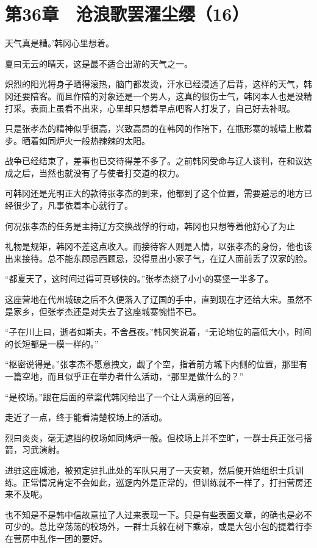 \section{第36章　沧浪歌罢濯尘缨（16）}

天气真是糟。’韩冈心里想着。

夏曰无云的晴天，这是最不适合出游的天气之一。

炽烈的阳光将身子晒得滚热，脑门都发烫，汗水已经浸透了后背，这样的天气，韩冈还要陪客。而且作陪的对象还是一个男人，这真的很伤士气，韩冈本人也是没精打采。表面上虽看不出来，心里却只想着早点吧客人打发了，自己好去补眠。

只是张孝杰的精神似乎很高，兴致高昂的在韩冈的作陪下，在瓶形寨的城墙上散着步。晒着如同炉火一般热辣辣的太阳。

战争已经结束了，差事也已交待得差不多了。之前韩冈受命与辽人谈判，在和议达成之后，当然也就没有了与使者打交道的权力。

可韩冈还是光明正大的款待张孝杰的到来，他都到了这个位置，需要避忌的地方已经很少了，凡事依着本心就行了。

何况张孝杰的任务是主持辽方交换战俘的行动，韩冈也只想等着他舒心了为止

礼物是规矩，韩冈不差这点收入。而接待客人则是人情，以张孝杰的身份，他也该出来接待。总不能东顾忌西顾忌，没得显出小家子气，在辽人面前丢了汉家的脸。

“都夏天了，这时间过得可真够快的。”张孝杰绕了小小的寨堡一半多了。

这座营地在代州城破之后不久便落入了辽国的手中，直到现在才还给大宋。虽然不是家乡，但张孝杰还是对失去了这座城寨惋惜不已。

“子在川上曰，逝者如斯夫，不舍昼夜。”韩冈笑说着，“无论地位的高低大小，时间的长短都是一模一样的。”

“枢密说得是。”张孝杰不愿意拽文，觑了个空，指着前方城下内侧的位置，那里有一篇空地，而且似乎正在举办者什么活动，“那里是做什么的？”

“是校场。”跟在后面的章楶代韩冈给出了一个让人满意的回答，

走近了一点，终于能看清楚校场上的活动。

烈曰炎炎，毫无遮挡的校场如同烤炉一般。但校场上并不空旷，一群士兵正张弓搭箭，习武演射。

进驻这座城池，被预定驻扎此处的军队只用了一天安顿，然后便开始组织士兵训练。正常情况肯定不会如此，巡逻内外是正常的，但训练就不一样了，打扫营房还来不及呢。

也不知是不是韩中信故意拉了人过来表现一下。只是有些表面文章，的确也是必不可少的。总比空荡荡的校场外，一群士兵躲在树下乘凉，或是大包小包的提着行李在营房中乱作一团的要好。

